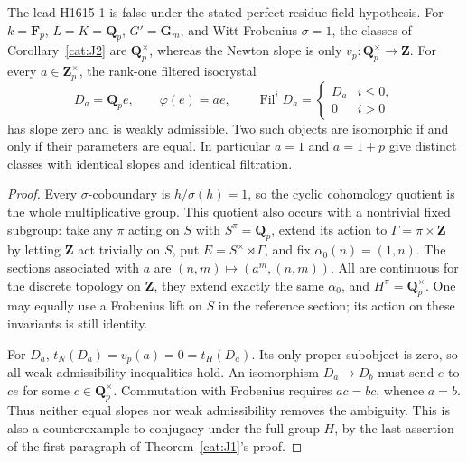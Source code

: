 \begin{proposition}\label{cat:J3}
The lead H1615-1 is false under the stated perfect-residue-field
hypothesis.  For $k=\mathbf F_p$, $L=K=\mathbf Q_p$, $G'=\mathbf G_m$,
and Witt Frobenius $\sigma=1$, the classes of
Corollary~\ref{cat:J2} are $\mathbf Q_p^\times$, whereas the Newton slope
is only $v_p:\mathbf Q_p^\times\to\mathbf Z$.
For every $a\in\mathbf Z_p^\times$, the rank-one filtered isocrystal
\[
 D_a=\mathbf Q_p e,\qquad \varphi(e)=a e,\qquad
 \operatorname{Fil}^iD_a=
 \begin{cases}D_a&i\leq0,\\0&i>0\end{cases}
\]
has slope zero and is weakly admissible.  Two such objects are
isomorphic if and only if their parameters are equal.  In particular
$a=1$ and $a=1+p$ give distinct classes with identical slopes and
identical filtration.
\end{proposition}
\begin{proof}
Every $\sigma$-coboundary is $h/\sigma(h)=1$, so the cyclic cohomology
quotient is the whole multiplicative group.  This quotient also occurs
with a nontrivial fixed subgroup: take any $\pi$ acting on $S$ with
$S^\pi=\mathbf Q_p$, extend its action to $\Gamma=\pi\times\mathbf Z$
by letting $\mathbf Z$ act trivially on $S$, put
$E=S^\times\rtimes\Gamma$, and fix
$\alpha_0(n)=(1,n)$.  The sections associated with $a$ are
$(n,m)\mapsto(a^m,(n,m))$.  All are continuous for the discrete topology
on $\mathbf Z$, they extend exactly the same $\alpha_0$, and
$H^\pi=\mathbf Q_p^\times$.  One may equally use a Frobenius lift on
$S$ in the reference section; its action on these invariants is still
identity.

For $D_a$, $t_N(D_a)=v_p(a)=0=t_H(D_a)$.  Its only proper subobject
is zero, so all weak-admissibility inequalities hold.  An isomorphism
$D_a\to D_b$ must send $e$ to $c e$ for some $c\in\mathbf Q_p^\times$.
Commutation with Frobenius requires $ac=bc$, whence $a=b$.
Thus neither equal slopes nor weak admissibility removes the ambiguity.
This is also a counterexample to conjugacy under the full group $H$,
by the last assertion of the first paragraph of
Theorem~\ref{cat:J1}'s proof.
\end{proof}

